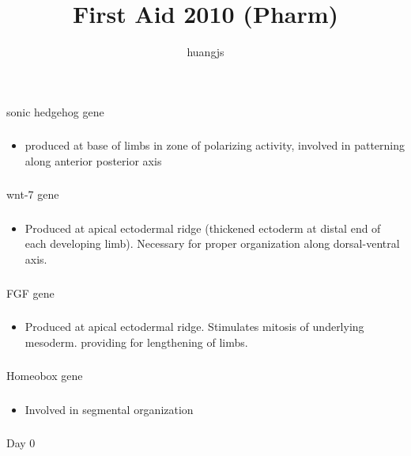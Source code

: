\documentclass[11pt]{beamer}
\title{First Aid 2010 (Pharm)}
\author{huangjs}
\begin{document}
\begin{frame}
 \frametitle{}
sonic hedgehog gene 
\end{frame}

\begin{frame}
 \frametitle{}
\begin{itemize}
\item{produced at base of limbs in zone of polarizing activity, involved in patterning along anterior posterior axis }
\end{itemize}
\end{frame}

\begin{frame}
 \frametitle{}
wnt-7 gene
\end{frame}

\begin{frame}
 \frametitle{}
\begin{itemize}
\item{Produced at apical ectodermal ridge (thickened ectoderm at distal end of each developing limb). Necessary for proper organization along dorsal-ventral axis.}
\end{itemize}
\end{frame}

\begin{frame}
 \frametitle{}
FGF gene
\end{frame}

\begin{frame}
 \frametitle{}
\begin{itemize}
\item{Produced at apical ectodermal ridge. Stimulates mitosis of underlying mesoderm. providing for lengthening of limbs.}
\end{itemize}
\end{frame}

\begin{frame}
 \frametitle{}
Homeobox gene
\end{frame}

\begin{frame}
 \frametitle{}
\begin{itemize}
\item{Involved in segmental organization}
\end{itemize}
\end{frame}

\begin{frame}
 \frametitle{}
Day 0
\end{frame}
\end{document}
